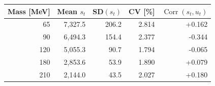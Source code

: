\begin{tabular}{rrrrr}
\toprule
Mass [MeV] & Mean $s_t$ & SD$(s_t)$ & CV [\%] & $\operatorname{Corr}(s_t,u_t)$\\
\midrule
65 & 7,327.5 & 206.2 & 2.814 & +0.162\\
90 & 6,494.3 & 154.4 & 2.377 & -0.344\\
120 & 5,055.3 & 90.7 & 1.794 & -0.065\\
180 & 2,853.6 & 53.9 & 1.890 & +0.079\\
210 & 2,144.0 & 43.5 & 2.027 & +0.180\\
\bottomrule
\end{tabular}
